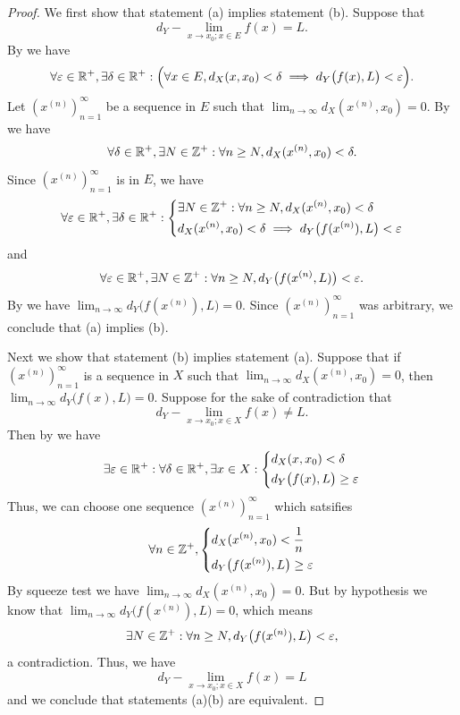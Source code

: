 \begin{proof}
  We first show that statement (a) implies statement (b).
  Suppose that
  \[
    d_Y - \lim_{x \to x_0 ; x \in E} f(x) = L.
  \]
  By  we have
  \[
    \forall \varepsilon \in \mathbb{R}^+, \exists \delta \in \mathbb{R}^+ : \Big(\forall x \in E, d_X(x, x_0) < \delta \implies d_Y\big(f(x), L\big) < \varepsilon\Big).
  \]
  Let \((x^{(n)})_{n = 1}^\infty\) be a sequence in \(E\) such that \(\lim_{n \to \infty} d_X(x^{(n)}, x_0) = 0\).
  By  we have
  \[
    \forall \delta \in \mathbb{R}^+, \exists N \in \mathbb{Z}^+ : \forall n \geq N, d_X(x^{(n)}, x_0) < \delta.
  \]
  Since \((x^{(n)})_{n = 1}^\infty\) is in \(E\), we have
  \[
    \forall \varepsilon \in \mathbb{R}^+, \exists \delta \in \mathbb{R}^+ : \begin{dcases}
      \exists N \in \mathbb{Z}^+ : \forall n \geq N, d_X(x^{(n)}, x_0) < \delta \\
      d_X(x^{(n)}, x_0) < \delta \implies d_Y\big(f(x^{(n)}), L\big) < \varepsilon
    \end{dcases}
  \]
  and
  \[
    \forall \varepsilon \in \mathbb{R}^+, \exists N \in \mathbb{Z}^+ : \forall n \geq N, d_Y\big(f(x^{(n)}, L)\big) < \varepsilon.
  \]
  By  we have \(\lim_{n \to \infty} d_Y\big(f(x^{(n)}), L\big) = 0\).
  Since \((x^{(n)})_{n = 1}^\infty\) was arbitrary, we conclude that (a) implies (b).

  Next we show that statement (b) implies statement (a).
  Suppose that if \((x^{(n)})_{n = 1}^\infty\) is a sequence in \(X\) such that \(\lim_{n \to \infty} d_X(x^{(n)}, x_0) = 0\), then \(\lim_{n \to \infty} d_Y\big(f(x), L\big) = 0\).
  Suppose for the sake of contradiction that
  \[
    d_Y - \lim_{x \to x_0 ; x \in X} f(x) \neq L.
  \]
  Then by  we have
  \[
    \exists \varepsilon \in \mathbb{R}^+ : \forall \delta \in \mathbb{R}^+, \exists x \in X : \begin{dcases}
      d_X(x, x_0) < \delta \\
      d_Y\big(f(x), L\big) \geq \varepsilon
    \end{dcases}
  \]
  Thus, we can choose one sequence \((x^{(n)})_{n = 1}^\infty\) which satsifies
  \[
    \forall n \in \mathbb{Z}^+, \begin{dcases}
      d_X(x^{(n)}, x_0) < \dfrac{1}{n} \\
      d_Y\big(f(x^{(n)}), L\big) \geq \varepsilon
    \end{dcases}
  \]
  By squeeze test we have \(\lim_{n \to \infty} d_X(x^{(n)}, x_0) = 0\).
  But by hypothesis we know that \(\lim_{n \to \infty} d_Y\big(f(x^{(n)}), L\big) = 0\), which means
  \[
    \exists N \in \mathbb{Z}^+ : \forall n \geq N, d_Y\big(f(x^{(n)}), L\big) < \varepsilon,
  \]
  a contradiction.
  Thus, we have
  \[
    d_Y - \lim_{x \to x_0 ; x \in X} f(x) = L
  \]
  and we conclude that statements (a)(b) are equivalent.


\end{proof}
